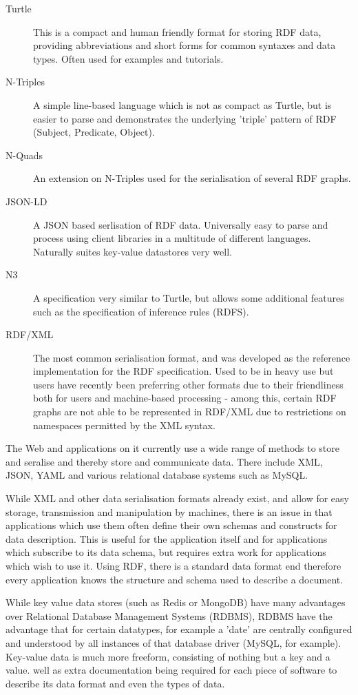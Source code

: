 \documentclass{article}
\begin{document}
\begin{description}
    \item[Turtle] This is a compact and human friendly format for storing RDF
    data, providing abbreviations and short forms for common syntaxes and
    data types. Often used for examples and tutorials.
    \item[N-Triples] A simple line-based language which is not as compact as 
    Turtle, but is easier to parse and demonstrates the underlying 'triple'
    pattern of RDF (Subject, Predicate, Object).
    \item[N-Quads] An extension on N-Triples used for the serialisation of
    several RDF graphs.
    \item[JSON-LD] A JSON based serlisation of RDF data. Universally easy to
    parse and process using client libraries in a multitude of different
    languages. Naturally suites key-value datastores very well.
    \item[N3] A specification very similar to Turtle, but allows some additional
    features such as the specification of inference rules (RDFS).
    \item[RDF/XML] The most common serialisation format, and was developed as
    the reference implementation for the RDF specification. Used to be in heavy
    use but users have recently been preferring other formats due to their
    friendliness both for users and machine-based processing - among this,
    certain RDF graphs are not able to be represented in RDF/XML due to
    restrictions on namespaces permitted by the XML syntax.
\end{description}

The Web and applications on it currently use a wide range of methods to store
and seralise and thereby store and communicate data. There include XML, JSON,
YAML and various relational database systems such as MySQL.

While XML and other data serialisation formats already exist, and allow for easy 
storage, transmission and manipulation by machines, there is an issue in that 
applications which use them often define their own schemas and constructs for 
data description. This is useful for the application itself and for applications 
which subscribe to its data schema, but requires extra work for applications which 
wish to use it. Using RDF, there is a standard data format end therefore every
application knows the structure and schema used to describe a document.

While key value data stores (such as Redis or MongoDB) have many advantages over 
Relational Database Management Systems (RDBMS), RDBMS have the advantage that for 
certain datatypes,
for example a 'date' are centrally configured and understood by all instances of
that database driver (MySQL, for example). Key-value data is much more freeform,
consisting of nothing but a key and a value. 
well as extra documentation being required for each piece of software to
describe its data format and even the types of data. 
\end{document}
